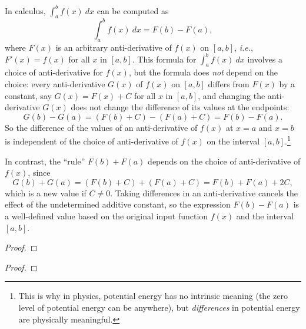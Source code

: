 \begin{exmp}
    In calculus, \(\int_{a}^{b} f(x) \ dx\) can be computed as
    \[\int_{a}^{b} f(x) \ dx = F(b) - F(a),\]
    where \(F(x)\) is an arbitrary anti-derivative of \(f(x)\) on \([a,b]\), \textit{i.e.}, \(F'(x) = f(x)\) for all \(x\) in \([a,b]\). This formula for \(\int_{a}^{b} f(x) \ dx\) involves a choice of anti-derivative for \(f(x)\), but the formula does \textit{not} depend on the choice: every anti-derivative \(G(x)\) of \(f(x)\) on \([a,b]\) differs from \(F(x)\) by a constant, say \(G(x) = F(x) + C\) for all \(x\) in \([a,b]\), and changing the anti-derivative \(G(x)\) does not change the difference of its values at the endpoints:
    \[G(b) - G(a) = (F(b) + C) - (F(a) + C) = F(b) - F(a).\]
    So the difference of the values of an anti-derivative of \(f(x)\) at \(x=a\) and \(x=b\) is independent of the choice of anti-derivative of \(f(x)\) on the interval \([a,b]\).\footnote[2]{This is why in physics, potential energy has no intrinsic meaning (the zero level of potential energy can be anywhere), but \textit{differences} in potential energy are physically meaningful.}

    In contrast, the ``rule'' \(F(b)+F(a)\) depends on the choice of anti-derivative of \(f(x)\), since
    \[G(b)+G(a) = (F(b)+ C) + (F(a) + C) = F(b) + F(a) + 2C,\]
    which is a new value if \(C \neq 0\). Taking differences in an anti-derivative cancels the effect of the undetermined additive constant, so the expression \(F(b)-F(a)\) is a well-defined value based on the original input function \(f(x)\) and the interval \([a,b]\).
\end{exmp}

\begin{note}
    \lipsum[][1-9]
\end{note}

\begin{rmrk}
    \lipsum[][1-9]
\end{rmrk}

\begin{lemm}
    \lipsum[][1-4]
\end{lemm}

\begin{proof}
    \lipsum[1]
\end{proof}

\begin{thrm}
    \lipsum[][1-4]
\end{thrm}

\begin{proof}
    \lipsum[1]
\end{proof}

\begin{coro}
    \lipsum[][1-4]
\end{coro}

